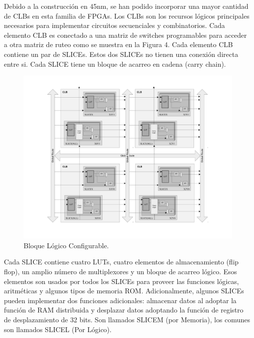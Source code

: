 Debido a la construcci\'{o}n en 45nm, se han podido incorporar una
mayor cantidad de CLBs en esta familia de FPGAs. Los CLBs son los
recursos l\'{o}gicos principales necesarios para implementar circuitos
secuenciales y combinatorios. Cada elemento CLB es conectado a una
matriz de switches programables para acceder a otra matriz de ruteo
como se muestra en la Figura 4. Cada elemento CLB contiene un par
de SLICEs. Estos dos SLICEs no tienen una conexi\'{o}n directa entre
si. Cada SLICE tiene un bloque de acarreo en cadena (carry chain).

\begin{doublespace}
\begin{figure}[H]
\begin{centering}
\includegraphics[scale=0.6]{img/spartan_arch}
\par\end{centering}
\caption{Bloque L\'{o}gico Configurable.}
\end{figure}

\end{doublespace}

Cada SLICE contiene cuatro LUTs, cuatro elementos de almacenamiento
(flip flop), un amplio n\'{u}mero de multiplexores y un bloque de
acarreo l\'{o}gico. Esos elementos son usados por todos los SLICEs
para proveer las funciones l\'{o}gicas, aritm\'{e}ticas y algunos
tipos de memoria ROM. Adicionalmente, algunos SLICEs pueden implementar
dos funciones adicionales: almacenar datos al adoptar la funci\'{o}n
de RAM distribuida y desplazar datos adoptando la funci\'{o}n de registro
de desplazamiento de 32 bits. Son llamados SLICEM (por Memoria), los
comunes son llamados SLICEL (Por L\'{o}gico).

